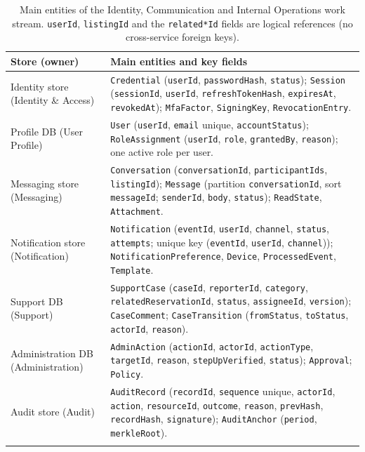 \begin{longtable}{@{}L{3.3cm}L{10.5cm}@{}}
\toprule
\textbf{Store (owner)} & \textbf{Main entities and key fields} \\
\midrule
\endhead
Identity store (Identity \& Access) &
  \texttt{Credential} (\texttt{userId}, \texttt{passwordHash},
  \texttt{status}); \texttt{Session} (\texttt{sessionId}, \texttt{userId},
  \texttt{refreshTokenHash}, \texttt{expiresAt}, \texttt{revokedAt});
  \texttt{MfaFactor}, \texttt{SigningKey}, \texttt{RevocationEntry}. \\
Profile DB (User Profile) &
  \texttt{User} (\texttt{userId}, \texttt{email} unique,
  \texttt{accountStatus}); \texttt{RoleAssignment} (\texttt{userId},
  \texttt{role}, \texttt{grantedBy}, \texttt{reason}); one active role per
  user. \\
Messaging store (Messaging) &
  \texttt{Conversation} (\texttt{conversationId}, \texttt{participantIds},
  \texttt{listingId}); \texttt{Message} (partition
  \texttt{conversationId}, sort \texttt{messageId}; \texttt{senderId},
  \texttt{body}, \texttt{status}); \texttt{ReadState},
  \texttt{Attachment}. \\
Notification store (Notification) &
  \texttt{Notification} (\texttt{eventId}, \texttt{userId},
  \texttt{channel}, \texttt{status}, \texttt{attempts}; unique key
  (\texttt{eventId}, \texttt{userId}, \texttt{channel}));
  \texttt{Notification\allowbreak Preference}, \texttt{Device},
  \texttt{Processed\allowbreak Event}, \texttt{Template}. \\
Support DB (Support) &
  \texttt{SupportCase} (\texttt{caseId}, \texttt{reporterId},
  \texttt{category}, \texttt{relatedReservationId}, \texttt{status},
  \texttt{assigneeId}, \texttt{version}); \texttt{CaseComment};
  \texttt{CaseTransition} (\texttt{fromStatus}, \texttt{toStatus},
  \texttt{actorId}, \texttt{reason}). \\
Administration DB (Administration) &
  \texttt{AdminAction} (\texttt{actionId}, \texttt{actorId},
  \texttt{actionType}, \texttt{targetId}, \texttt{reason},
  \texttt{stepUpVerified}, \texttt{status}); \texttt{Approval};
  \texttt{Policy}. \\
Audit store (Audit) &
  \texttt{AuditRecord} (\texttt{recordId}, \texttt{sequence} unique,
  \texttt{actorId}, \texttt{action}, \texttt{resourceId},
  \texttt{outcome}, \texttt{reason}, \texttt{prevHash},
  \texttt{recordHash}, \texttt{signature}); \texttt{AuditAnchor}
  (\texttt{period}, \texttt{merkleRoot}). \\
\bottomrule
\caption{Main entities of the Identity, Communication and Internal
Operations work stream. \texttt{userId}, \texttt{listingId} and the
\texttt{related*Id} fields are logical references (no cross-service foreign
keys).}
\label{tab:id-model}
\end{longtable}

